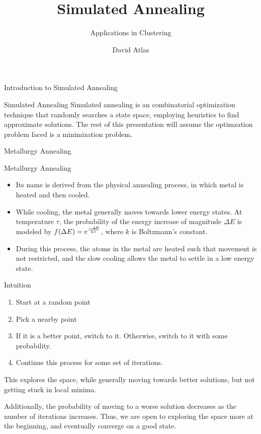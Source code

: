 \documentclass[{pdf, t}]{beamer}
\title{Simulated Annealing}
\subtitle{Applications in Clustering}
\author{David Atlas}
\begin{document}
\begin{frame}
  \titlepage
\end{frame}

\begin{frame}{Introduction to Simulated Annealing}
\begin{block}{Simulated Annealing}
Simulated annealing is an combinatorial optimization technique that randomly searches a state space, employing heuristics to find approximate solutions. The rest of this presentation
will assume the optimzation problem faced is a minimization problem.
\end{block}
\end{frame}

\begin{frame}{Metallurgy Annealing}
\begin{block}{Metallurgy Annealing}
\begin{itemize}
\item Its name is derived from the physical annealing process, in which metal is heated and then cooled.

\item While cooling, the metal generally moves towards lower energy states. At temperature $\tau$, the probability of the energy increase of
magnitude $\Delta E$ is modeled by $f(\Delta E) = \rm{e}^{\frac{-\Delta E}{k \tau}}$, where $k$ is Boltzmann's constant.

\item During this process, the atoms in the metal are heated such that movement is not restricted, and the slow cooling allows the metal to settle in a low energy state.
\end{itemize}
\end{block}
\end{frame}

\begin{frame}{Intuition}
\begin{enumerate}
  \item Start at a random point
  \item Pick a nearby point
  \item If it is a better point, switch to it. Otherwise,
    switch to it with some probability.
  \item Continue this process for some set of iterations.
\end{enumerate}
This explores the space, while generally moving towards better
solutions, but not getting stuck in local minima.

Additionally, the probability of moving to a worse solution decreases as the number of iterations increases.
Thus, we are open to exploring the space more at
the beginning, and eventually converge on a good state.
\end{frame}
\end{document}
